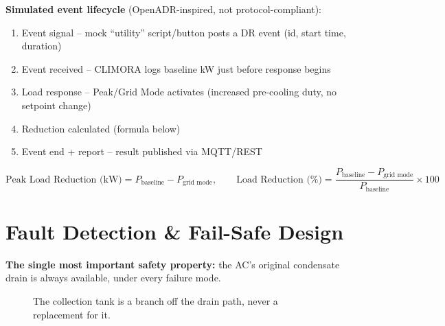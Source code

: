 \documentclass[11pt,a4paper]{article}
\begin{document}
\textbf{Simulated event lifecycle} (OpenADR-inspired, not protocol-compliant):
\begin{enumerate}[nosep]
    \item Event signal -- mock ``utility'' script/button posts a DR event (id, start time, duration)
    \item Event received -- CLIMORA logs baseline kW just before response begins
    \item Load response -- Peak/Grid Mode activates (increased pre-cooling duty, no setpoint change)
    \item Reduction calculated (formula below)
    \item Event end + report -- result published via MQTT/REST
\end{enumerate}

\begin{equation}
\text{Peak Load Reduction (kW)} = P_{\text{baseline}} - P_{\text{grid mode}}, \qquad
\text{Load Reduction (\%)} = \frac{P_{\text{baseline}} - P_{\text{grid mode}}}{P_{\text{baseline}}} \times 100
\end{equation}

\section{Fault Detection \& Fail-Safe Design}
\label{sec:failsafe}

\textbf{The single most important safety property:} the AC's original condensate drain is always available, under every failure mode.

\begin{figure}[h!]
\centering
{}
\caption{The collection tank is a branch off the drain path, never a replacement for it.}
\end{figure}
\end{document}
